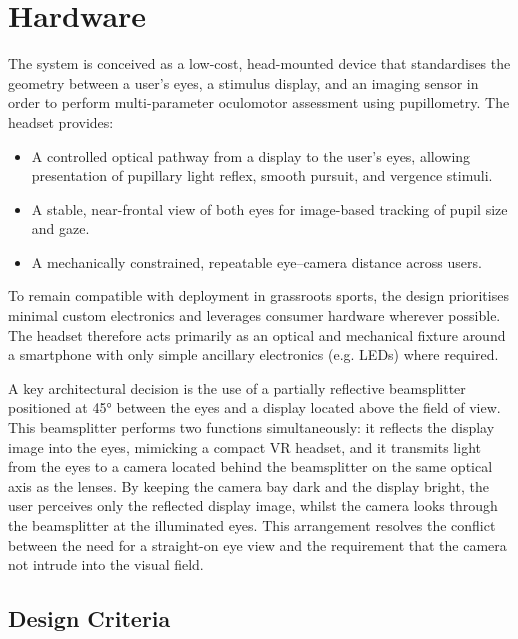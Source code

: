 \chapter{Hardware}
\label{chapter:headset}

The system is conceived as a low-cost, head-mounted device that standardises the geometry between a user's eyes, a stimulus display, and an imaging sensor in order to perform multi-parameter oculomotor assessment using pupillometry. The headset provides:

\begin{itemize}
    \item A controlled optical pathway from a display to the user's eyes, allowing presentation of pupillary light reflex, smooth pursuit, and vergence stimuli.

    \item A stable, near-frontal view of both eyes for image-based tracking of pupil size and gaze.

    \item A mechanically constrained, repeatable eye--camera distance across users.
\end{itemize}

To remain compatible with deployment in grassroots sports, the design prioritises minimal custom electronics and leverages consumer hardware wherever possible. The headset therefore acts primarily as an optical and mechanical fixture around a smartphone with only simple ancillary electronics (e.g. LEDs) where required.

A key architectural decision is the use of a partially reflective beamsplitter positioned at 45° between the eyes and a display located above the field of view. This beamsplitter performs two functions simultaneously: it reflects the display image into the eyes, mimicking a compact VR headset, and it transmits light from the eyes to a camera located behind the beamsplitter on the same optical axis as the lenses. By keeping the camera bay dark and the display bright, the user perceives only the reflected display image, whilst the camera looks through the beamsplitter at the illuminated eyes. This arrangement resolves the conflict between the need for a straight-on eye view and the requirement that the camera not intrude into the visual field.


\section{Design Criteria}

